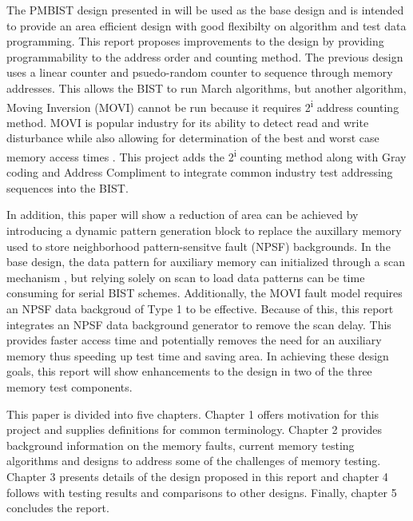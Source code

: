 The PMBIST design presented in \cite{1584083} will be used as the base design and is intended to provide an area efficient design with good flexibilty on algorithm and test data programming.  This report proposes improvements to the design by providing programmability to the address order and counting method. The previous design uses a linear counter and psuedo-random counter to sequence through memory addresses.  This allows the BIST to run March algorithms, but another algorithm, Moving Inversion (MOVI) cannot be run because it requires 2\textsuperscript{i} address counting method.   MOVI is popular industry for its ability to detect read and write disturbance while also allowing for determination of the best and worst case memory access times \cite{VanDeGoor1991}.  This project adds the 2\textsuperscript{i} counting method along with Gray coding and Address Compliment to integrate common industry test addressing sequences into the BIST. 

In addition, this paper will show a reduction of area can be achieved by introducing a dynamic pattern generation block to replace the auxillary memory used to store neighborhood pattern-sensitve fault (NPSF) backgrounds.  In the base design, the data pattern for auxiliary memory can initialized through a scan mechanism \cite{748806}, but relying solely on scan to load data patterns can be time consuming for serial BIST schemes.  Additionally, the MOVI fault model requires an NPSF data backgroud of Type 1 to be effective.  Because of this, this report integrates an NPSF data background generator to remove the scan delay.  This provides faster access time and potentially removes the need for an auxiliary memory thus speeding up test time and saving area.  In achieving these design goals, this report will show enhancements to the \cite{1584083} design in two of the three memory test components.

This paper is divided into five chapters.
Chapter 1 offers motivation for this project and supplies definitions for common terminology.  Chapter 2 provides background information on the memory faults, current memory testing algorithms and designs to address some of the challenges of memory testing.  Chapter 3 presents details of the design proposed in this report and chapter 4 follows with testing results and comparisons to other designs.
Finally, chapter 5 concludes the report.  





